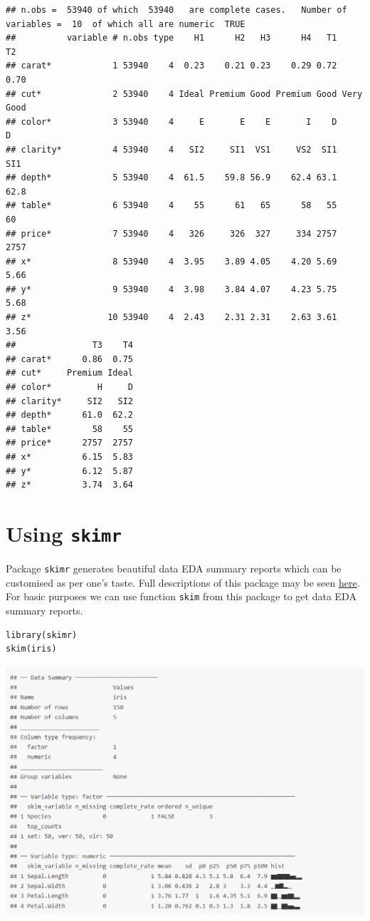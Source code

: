 \documentclass[
]{book}
\begin{document}
\begin{verbatim}
## n.obs =  53940 of which  53940   are complete cases.   Number of variables =  10  of which all are numeric  TRUE  
##          variable # n.obs type    H1      H2   H3      H4   T1        T2
## carat*            1 53940    4  0.23    0.21 0.23    0.29 0.72      0.70
## cut*              2 53940    4 Ideal Premium Good Premium Good Very Good
## color*            3 53940    4     E       E    E       I    D         D
## clarity*          4 53940    4   SI2     SI1  VS1     VS2  SI1       SI1
## depth*            5 53940    4  61.5    59.8 56.9    62.4 63.1      62.8
## table*            6 53940    4    55      61   65      58   55        60
## price*            7 53940    4   326     326  327     334 2757      2757
## x*                8 53940    4  3.95    3.89 4.05    4.20 5.69      5.66
## y*                9 53940    4  3.98    3.84 4.07    4.23 5.75      5.68
## z*               10 53940    4  2.43    2.31 2.31    2.63 3.61      3.56
##               T3    T4
## carat*      0.86  0.75
## cut*     Premium Ideal
## color*         H     D
## clarity*     SI2   SI2
## depth*      61.0  62.2
## table*        58    55
## price*      2757  2757
## x*          6.15  5.83
## y*          6.12  5.87
## z*          3.74  3.64
\end{verbatim}

\hypertarget{using-skimr}{%
\section{\texorpdfstring{Using \texttt{skimr}}{Using skimr}}\label{using-skimr}}

Package \texttt{skimr} generates beautiful data EDA summary reports which can be customised as per one's taste. Full descriptions of this package may be seen \href{https://cran.r-project.org/web/packages/skimr/vignettes/skimr.html}{here}. For basic purposes we can use function \texttt{skim} from this package to get data EDA summary reports.

\begin{verbatim}
library(skimr)
skim(iris)
\end{verbatim}

\includegraphics[width=0.5\linewidth]{images/skmi1}
\end{document}

